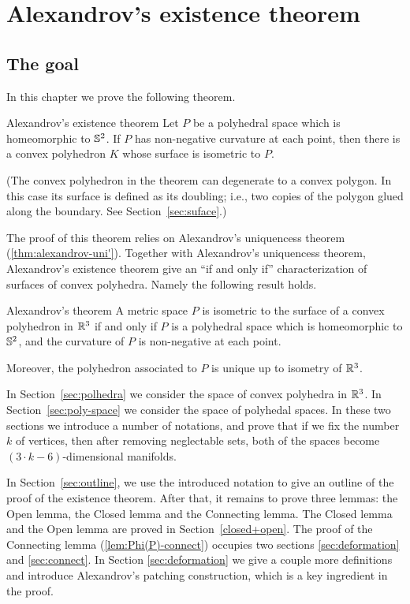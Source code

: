 \chapter{Alexandrov's existence theorem}\label{chap:exist}

\section{The goal}

In this chapter we prove the following theorem.

\begin{thm}{Alexandrov's existence theorem}\label{thm:alex-exist}
Let $P$ be a polyhedral space which is homeomorphic to $\mathbb{S}^2$.
If $P$ has non-negative curvature at each point,
then there is a convex polyhedron $K$ whose surface is isometric to $P$.

(The convex polyhedron in the theorem can degenerate to a convex polygon.
In this case its surface is defined as its doubling; 
i.e., two copies of the polygon glued along the boundary. 
See Section~\ref{sec:suface}.)
\end{thm}

The proof of this theorem relies on Alexandrov's uniquencess theorem (\ref{thm:alexandrov-uni'}).
Together with Alexandrov's uniquencess theorem, Alexandrov's existence theorem 
give an ``if and only if'' characterization of surfaces of convex polyhedra.
Namely the following result holds.

\begin{thm}{Alexandrov's theorem}\label{thm:alexandrov}
A metric space $P$ is isometric to the surface of a convex polyhedron in $\mathbb{R}^3$ %
if and only if $P$ is a polyhedral space which is homeomorphic to $\mathbb{S}^2$,
and the curvature of $P$ is non-negative at each point.

Moreover, the polyhedron associated to $P$ is unique up to isometry of $\mathbb{R}^3$.
\end{thm}

In Section~\ref{sec:polhedra} 
we consider the space of convex polyhedra in $\mathbb{R}^3$.
In Section~\ref{sec:poly-space} we consider the space of polyhedal spaces.
In these two sections we introduce a number of notations, 
and prove that if we fix the number $k$ of vertices,
then after removing neglectable sets,
both of the spaces become $(3\cdot k-6)$-dimensional manifolds.

In Section~\ref{sec:outline},
we use the introduced notation to give an outline of the proof of the existence theorem.
After that, it remains to prove three lemmas:
the Open lemma, the Closed lemma and the Connecting lemma.
The Closed lemma and the Open lemma are proved in Section~\ref{closed+open}.
The proof of the Connecting lemma (\ref{lem:Phi(P)-connect}) occupies two sections
\ref{sec:deformation}
and \ref{sec:connect}.
In Section \ref{sec:deformation} we give a couple more definitions and introduce Alexandrov's patching construction, which is a key ingredient in the proof.


